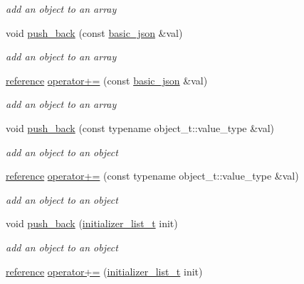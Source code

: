 \begin{DoxyCompactItemize}
\begin{DoxyCompactList}\small\item\em add an object to an array \end{DoxyCompactList}\item 
void \hyperlink{classnlohmann_1_1basic__json_a3405d38087e13994a5a4556065b0be6d}{push\+\_\+back} (const \hyperlink{classnlohmann_1_1basic__json}{basic\+\_\+json} \&val)
\begin{DoxyCompactList}\small\item\em add an object to an array \end{DoxyCompactList}\item 
\hyperlink{classnlohmann_1_1basic__json_a220ae98554a76205fb7f8822d36b2d5a}{reference} \hyperlink{classnlohmann_1_1basic__json_af643a4baa91f484b11af0e4437183115}{operator+=} (const \hyperlink{classnlohmann_1_1basic__json}{basic\+\_\+json} \&val)
\begin{DoxyCompactList}\small\item\em add an object to an array \end{DoxyCompactList}\item 
void \hyperlink{classnlohmann_1_1basic__json_ad704839e6a5195e3b76f22e2b9aa63ee}{push\+\_\+back} (const typename object\+\_\+t\+::value\+\_\+type \&val)
\begin{DoxyCompactList}\small\item\em add an object to an object \end{DoxyCompactList}\item 
\hyperlink{classnlohmann_1_1basic__json_a220ae98554a76205fb7f8822d36b2d5a}{reference} \hyperlink{classnlohmann_1_1basic__json_ae300819781bce2193369609457f70f30}{operator+=} (const typename object\+\_\+t\+::value\+\_\+type \&val)
\begin{DoxyCompactList}\small\item\em add an object to an object \end{DoxyCompactList}\item 
void \hyperlink{classnlohmann_1_1basic__json_a4567cf75f19b1efca090f75d7a8a350a}{push\+\_\+back} (\hyperlink{classnlohmann_1_1basic__json_a4d392f594e4c32345d47c2a175aad5c8}{initializer\+\_\+list\+\_\+t} init)
\begin{DoxyCompactList}\small\item\em add an object to an object \end{DoxyCompactList}\item 
\hyperlink{classnlohmann_1_1basic__json_a220ae98554a76205fb7f8822d36b2d5a}{reference} \hyperlink{classnlohmann_1_1basic__json_ac48302a8b4f8c2a6e30c2a7bff6abc49}{operator+=} (\hyperlink{classnlohmann_1_1basic__json_a4d392f594e4c32345d47c2a175aad5c8}{initializer\+\_\+list\+\_\+t} init)

\end{DoxyCompactItemize}
